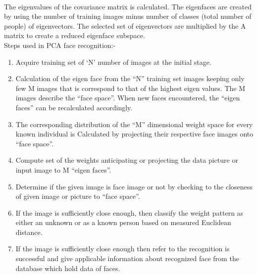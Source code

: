 \documentclass[a4paper, 12pt]{report}
\begin{document}
\paragraph{}
The eigenvalues of the covariance matrix is calculated. The eigenfaces are created by using the number of training
images minus number of classes (total number of people) of eigenvectors. The selected set of
eigenvectors are multiplied by the A matrix to create a reduced eigenface subspace.\\
Steps used in PCA face recognition:-
\begin{enumerate}

\item
Acquire training set of ‘N’ number of images at the initial stage.
\item
Calculation of the eigen face from the “N” training set images keeping only few M images
that is correspond to that of the highest eigen values. The M images describe the “face
space”. When new faces encountered, the “eigen faces” can be recalculated accordingly.
\item
The corresponding distribution of the “M” dimensional weight space for every known
individual is Calculated by projecting their respective face images onto “face space”.
\item
Compute set of the weights anticipating or projecting the data picture or input image to
M “eigen faces”.
\item
Determine if the given image is face image or not by checking to the closeness of given
image or picture to “face space”.
\item
If the image is sufficiently close enough, then classify the weight pattern as either an
unknown or as a known person based on measured Euclidean distance.
\item
If the image is sufficiently close enough then refer to the recognition is successful and give
applicable information about recognized face from the database which hold data of faces.
\end{enumerate}
\newpage
\end{document}
